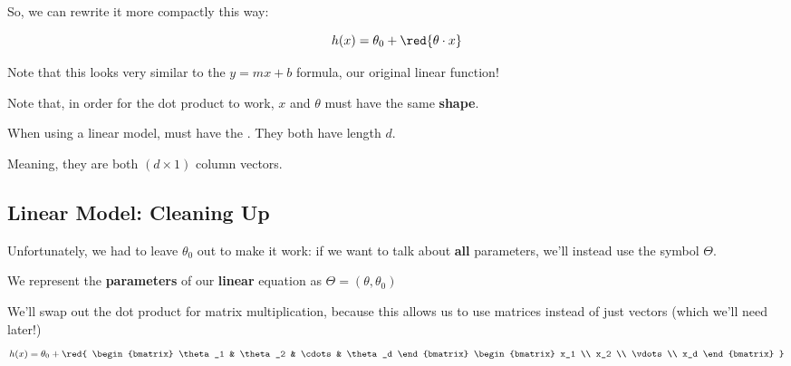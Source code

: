        So, we can rewrite it more compactly this way:
        
        \begin{equation}
            h(x) = \theta_0 + \red{\theta \cdot x} 
        \end{equation}
        
        Note that this looks very similar to the $y=mx+b$ formula, our original linear function!
        
        Note that, in order for the dot product to work, $x$ and $\theta$ must have the same \textbf{shape}.\\
        
        \begin{concept}
            When using a linear model,  must have the . They both have length $d$.
            
            Meaning, they are both $(d \times 1)$ column vectors.
        \end{concept}
        
    \subsection{Linear Model: Cleaning Up}
        
        Unfortunately, we had to leave $\theta_0$ out to make it work: if we want to talk about \textbf{all} parameters, we'll instead use the symbol $\Theta$.\\
        
        \begin{notation}
            We represent the \textbf{parameters} of our \textbf{linear} equation as $\Theta = (\theta, \theta_0)$
        \end{notation}
        
        We'll swap out the dot product for matrix multiplication, because this allows us to use matrices instead of just vectors (which we'll need later!)\\
        
        \begin{equation}
            h(x) = \theta_0 +
            \red{
                \begin{bmatrix}
                    \theta_1 & \theta_2 & \cdots & \theta_d
                \end{bmatrix}
                \begin{bmatrix}
                    x_1 \\ x_2 \\ \vdots \\ x_d
                \end{bmatrix}
            }
        \end{equation}
        
